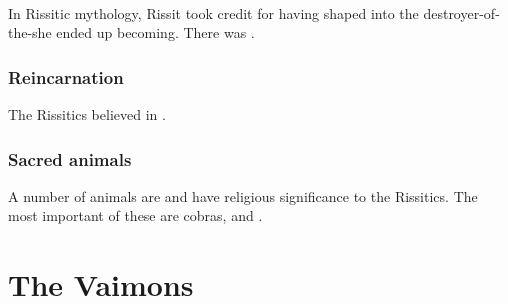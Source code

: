 \subsubsection{\Belzir}
In Rissitic mythology, Rissit took credit for having shaped \Belzir into the destroyer-of-the-\caliphate she ended up becoming.
There was . 










\subsection{Reincarnation}
The Rissitics believed in . 









\subsection{Sacred animals}
A number of animals are  and have religious significance to the Rissitics. 
The most important of these are cobras,  and . 








































\chapter{The Vaimons}















